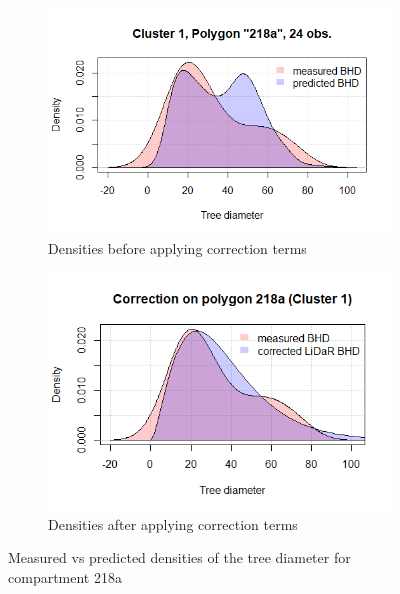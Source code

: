 \begin{figure}[H]
\centering
\begin{subfigure}{.5\textwidth}
  \centering
  \includegraphics[width=.9\linewidth]{cluster1_218a_24.png}
  \caption{Densities before applying correction terms}
  \label{fig:polygon_before_218a}
\end{subfigure}%
\begin{subfigure}{.5\textwidth}
  \centering
  \includegraphics[width=0.86\linewidth]{corrected_cluster1_218a.png}
  \caption{Densities after applying correction terms}
  \label{fig:polygon_after_218a}
\end{subfigure}
\caption{Measured vs predicted densities of the tree diameter for compartment 218a}
\label{fig:correction_polygon_218a}
\end{figure}

